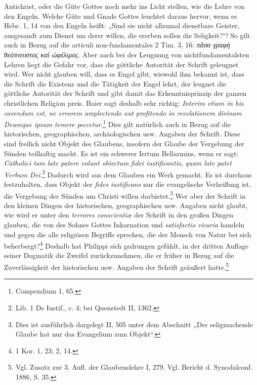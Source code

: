 Antichrist, oder die Güte Gottes noch mehr ins Licht stellen, wie die Lehre von den Engeln. Welche Güte und Gnade Gottes leuchtet daraus hervor, wenn es Hebr. 1, 14 von den Engeln heißt: „Sind sie nicht allzumal dienstbare Geister, ausgesandt zum Dienst um derer willen, die ererben sollen die Seligkeit?“! So gilt auch in Bezug auf die articuli non-fundamentales 2 Tim. 3, 16: \textit{πᾶσα γραφὴ θεόπνευστος καὶ ὠφέλιμος}. Aber auch bei der Leugnung von nichtfundamentalsten Lehren liegt die Gefahr vor, dass die göttliche Autorität der Schrift geleugnet wird. Wer nicht glauben will, dass es Engel gibt, wiewohl ihm bekannt ist, dass die Schrift die Existenz und die Tätigkeit der Engel lehrt, der leugnet die göttliche Autorität der Schrift und gibt damit das Erkenntnisprinzip der ganzen christlichen Religion preis. Baier sagt deshalb sehr richtig: \textit{Interim etiam in his cavendum est, ne errorem amplectendo aut profitendo in revelationem divinam Deumque ipsum temere peccetur}.\footnote{Compendium 1, 65.} Dies gilt natürlich auch in Bezug auf die historischen, geographischen, archäologischen usw. Angaben der Schrift. Diese sind freilich nicht Objekt des Glaubens, insofern der Glaube der Vergebung der Sünden teilhaftig macht. Es ist ein schwerer Irrtum Bellarmins, wenn er sagt: \textit{Catholici tam late patere volunt obiectum fidei iustificantis, quam late patet Verbum Dei}.\footnote{Lib. 1 De Iustif., c. 4; bei Quenstedt II, 1362.} Dadurch wird aus dem Glauben ein Werk gemacht. Es ist durchaus festzuhalten, dass Objekt der \textit{fides iustificans} nur die evangelische Verheißung ist, die Vergebung der Sünden um Christi willen darbietet.\footnote{Dies ist ausführlich dargelegt II, 505 unter dem Abschnitt „Der seligmachende Glaube hat nur das Evangelium zum Objekt“.} Wer aber der Schrift in den kleinen Dingen der historischen, geographischen usw. Angaben nicht glaubt, wie wird er unter den \textit{terrores conscientiæ} der Schrift in den großen Dingen glauben, die von des Sohnes Gottes Inkarnation und \textit{satisfactio vicaria} handeln und gegen die alle religiösen Begriffe sprechen, die der Mensch von Natur bei sich beherbergt?\footnote{1 Kor. 1, 23; 2, 14.} Deshalb hat Philippi sich gedrungen gefühlt, in der dritten Auflage seiner Dogmatik die Zweifel zurückzunehmen, die er früher in Bezug auf die Zuverlässigkeit der historischen usw. Angaben der Schrift geäußert hatte.\footnote{Vgl. Zusatz zur 3. Aufl. der Glaubenslehre I, 279. Vgl. Bericht d. Synodalconf. 1886, S. 35.}
